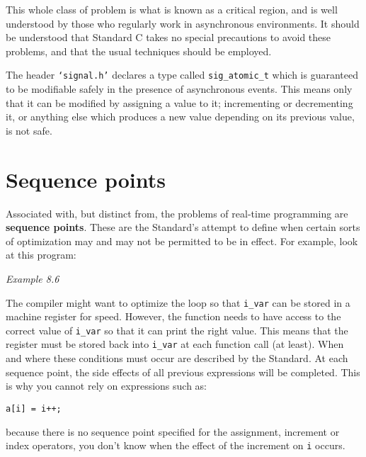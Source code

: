     This whole class of problem is what is known as a critical region,
     and is well understood by those who regularly work in asynchronous
     environments. It should be understood that Standard C takes no special
     precautions to avoid these problems, and that the usual techniques
     should be employed.


    The header \texttt{`signal.h'} declares a type called
     \texttt{sig\_atomic\_t} which is guaranteed to be modifiable safely
     in the presence of asynchronous events. This means only that it can be
     modified by assigning a value to it; incrementing or decrementing it,
     or anything else which produces a new value depending on its previous
     value, is not safe.


   

  

 
        \section{Sequence points}
        

  

  Associated with, but distinct from, the problems of real-time
   programming are \textbf{sequence points}. These are the Standard's
   attempt to define when certain sorts of optimization may and may not be
   permitted to be in effect. For example, look at this program:


  \begin{center}\textit{Example 8.6}\end{center}


  The compiler might want to optimize the loop so that \texttt{i\_var}
   can be stored in a machine register for speed. However, the function
   needs to have access to the correct value of \texttt{i\_var} so that
   it can print the right value. This means that the register must be stored
   back into \texttt{i\_var} at each function call (at least).  When and
   where these conditions must occur are described by the Standard. At each
   sequence point, the side effects of all previous expressions will be
   completed. This is why you cannot rely on expressions such as:


  \begin{Verbatim}
a[i] = i++;
\end{Verbatim}

  because there is no sequence point specified for the assignment,
   increment or index operators, you don't know when the effect of the
   increment on \texttt{i} occurs.


